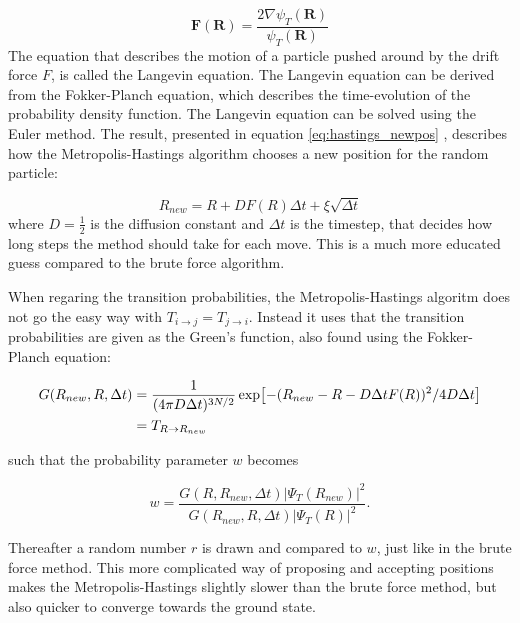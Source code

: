 \documentclass[norsk,a4paper,12pt]{article}
\begin{document}
\begin{equation}
\label{eq:drift_force}
\boldsymbol{F}(\boldsymbol{R}) = \frac{2 \nabla \psi_T(\boldsymbol{R})}{\psi_T(\boldsymbol{R})}
\end{equation}
The equation that describes the motion of a particle pushed around by the drift force $F$, is called the Langevin equation. The Langevin equation can be derived from the Fokker-Planch equation, which describes the time-evolution of the probability density function. The Langevin equation can be solved using the Euler method. The result, presented in equation \ref{eq:hastings_newpos} , describes how the Metropolis-Hastings algorithm chooses a new position for the random particle:

\begin{equation}
\label{eq:hastings_newpos}
R_{new} = R + DF(R)\Delta t + \xi\sqrt{\Delta t}
\end{equation}
where $D=\frac{1}{2}$ is the diffusion constant and $\Delta t$ is the timestep, that decides how long steps the method should take for each move. This is a much more educated guess compared to the brute force algorithm. 
\par 
\vspace{3mm}
When regaring the transition probabilities, the Metropolis-Hastings algoritm does not go the easy way with $T_{i\rightarrow j} = T_{j\rightarrow i}$.  Instead it uses that the transition probabilities are given as the Green's function, also found using the Fokker-Planch equation:

\begin{align}
G(R_{new},R,\Delta t)&=\frac{1}{(4\pi D\Delta t)^{3N/2}}\exp[-(R_{new} - R - D\Delta tF(R))^2/4D\Delta t]\notag\\
&=T_{R\rightarrow R_{new}}
\end{align}

such that the probability parameter $w$ becomes 

\begin{equation}
w = \frac{G(R,R_{new},\Delta t)|\Psi_T(R_{new})|^2}{G(R_{new},R,\Delta t)|\Psi_T(R)|^2}.
\end{equation}

Thereafter a random number $r$ is drawn and compared to $w$, just like in the brute force method. This more complicated way of proposing and accepting positions makes the Metropolis-Hastings slightly slower than the brute force method, but also quicker to converge towards the ground state.
\par 
\vspace{3mm}
\end{document}
